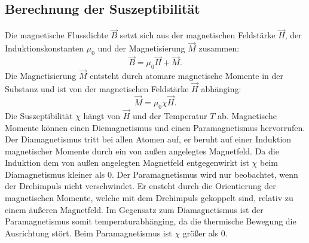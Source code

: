 \subsection{Berechnung der Suszeptibilität}
Die magnetische Flussdichte $\vec{B}$ setzt sich aus der magnetischen Feldstärke
$\vec{H}$, der Induktionskonstanten $\mu_0$ und der Magnetisierung $\vec{M}$
zusammen:
\begin{equation}
  \vec{B} = \mu_0 \vec{H} + \vec{M}.
\end{equation}
Die Magnetisierung $\vec{M}$ entsteht durch atomare magnetische Momente in der
Substanz und ist von der magnetischen Feldstärke $\vec{H}$ abhänging:
\begin{equation}
  \vec{M} = \mu_0 \chi \vec{H}.
\end{equation}
Die Suszeptibilität $\chi$ hängt von $\vec{H}$ und der Temperatur $T$ ab.
Magnetische Momente können einen Diemagnetismus und einen Paramagnetismus
hervorrufen. Der Diamagnetismus tritt bei allen Atomen auf, er beruht auf einer
Induktion magnetischer Momente durch ein von außen angelegtes Magnetfeld.
Da die Induktion dem von außen angelegten Magnetfeld entgegenwirkt ist $\chi$
beim Diamagnetismus kleiner als 0. Der Paramagnetismus wird nur beobachtet, wenn
der Drehimpuls nicht verschwindet. Er ensteht durch die Orientierung der
magnetischen Momente, welche mit dem Drehimpuls gekoppelt sind, relativ zu einem
äußeren Magnetfeld. Im Gegensatz zum Diamagnetismus ist der Paramagnetismus somit
temperaturabhänging, da die thermische Bewegung die Ausrichtung stört. Beim
Paramagnetismus ist $\chi$ größer als 0.

